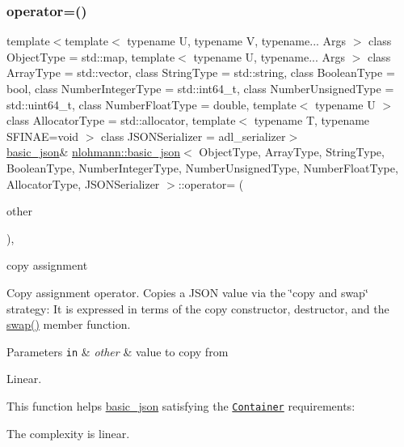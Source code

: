 \subsubsection{\texorpdfstring{operator=()}{operator=()}}
{\footnotesize\ttfamily template$<$template$<$ typename U, typename V, typename... Args $>$ class Object\+Type = std\+::map, template$<$ typename U, typename... Args $>$ class Array\+Type = std\+::vector, class String\+Type  = std\+::string, class Boolean\+Type  = bool, class Number\+Integer\+Type  = std\+::int64\+\_\+t, class Number\+Unsigned\+Type  = std\+::uint64\+\_\+t, class Number\+Float\+Type  = double, template$<$ typename U $>$ class Allocator\+Type = std\+::allocator, template$<$ typename T, typename S\+F\+I\+N\+A\+E=void $>$ class J\+S\+O\+N\+Serializer = adl\+\_\+serializer$>$ \\
\mbox{\hyperlink{classnlohmann_1_1basic__json}{basic\+\_\+json}}\& \mbox{\hyperlink{classnlohmann_1_1basic__json}{nlohmann\+::basic\+\_\+json}}$<$ Object\+Type, Array\+Type, String\+Type, Boolean\+Type, Number\+Integer\+Type, Number\+Unsigned\+Type, Number\+Float\+Type, Allocator\+Type, J\+S\+O\+N\+Serializer $>$\+::operator= (\begin{DoxyParamCaption}\item[{\mbox{\hyperlink{classnlohmann_1_1basic__json}{basic\+\_\+json}}$<$ Object\+Type, Array\+Type, String\+Type, Boolean\+Type, Number\+Integer\+Type, Number\+Unsigned\+Type, Number\+Float\+Type, Allocator\+Type, J\+S\+O\+N\+Serializer $>$}]{other }\end{DoxyParamCaption})\hspace{0.3cm}{\ttfamily [inline]}, {\ttfamily [noexcept]}}



copy assignment 

Copy assignment operator. Copies a J\+S\+ON value via the \char`\"{}copy and swap\char`\"{} strategy\+: It is expressed in terms of the copy constructor, destructor, and the {\ttfamily \mbox{\hyperlink{classnlohmann_1_1basic__json_a8c9d932353e1ab98a7dc2fc27e002031}{swap()}}} member function.


\begin{DoxyParams}[1]{Parameters}
\mbox{\tt in}  & {\em other} & value to copy from\\
\hline
\end{DoxyParams}
Linear.

This function helps {\ttfamily \mbox{\hyperlink{classnlohmann_1_1basic__json}{basic\+\_\+json}}} satisfying the \href{https://en.cppreference.com/w/cpp/named_req/Container}{\tt Container} requirements\+:
\begin{DoxyItemize}
\item The complexity is linear.
\end{DoxyItemize}

